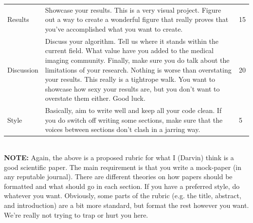\documentclass[10pt]{article}
\begin{document}
\begin{table}[h]
\begin{center}
\begin{tabular}{L{2.5cm}|L{9cm}|L{2cm}}
Results & Showcase your results.  This is a very visual project.  Figure out a way to create a wonderful figure that really proves that you've accomplished what you want to create. & 15\\
Discussion & Discuss your algorithm.  Tell us where it stands within the current field.  What value have you added to the medical imaging community.  Finally, make sure you do talk about the limitations of your research.  Nothing is worse than overstating your results.  This really is a tightrope walk.  You want to showcase how sexy your results are, but you don't want to overstate them either.  Good luck. & 20\\
Style & Basically, aim to write well and keep all your code clean.  If you do switch off writing some sections, make sure that the voices between sections don't clash in a jarring way. & 5\\
\midrule
\midrule
\end{tabular}
\end{center}
\end{table}


\ \\
\textbf{NOTE:} Again, the above is a proposed rubric for what I (Darvin) think is a good scientific paper.  The main requirement is that you write a mock-paper (in any reputable journal).  There are different theories on how papers should be formatted and what should go in each section.  If you have a preferred style, do whatever you want.  Obviously, some parts of the rubric (e.g. the title, abstract, and introduction) are a bit more standard, but format the rest however you want.  We're really not trying to trap or hurt you here.
\end{document}
